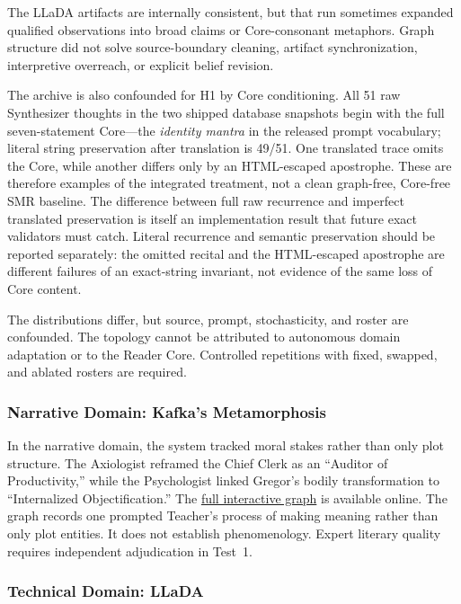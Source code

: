The LLaDA artifacts are internally consistent, but that run sometimes
expanded qualified observations into broad claims or Core-consonant metaphors.
Graph structure did not solve source-boundary cleaning, artifact synchronization, interpretive overreach, or explicit belief revision.

The archive is also confounded for H1 by Core conditioning. All 51 raw
Synthesizer thoughts in the two shipped database snapshots begin with the full
seven-statement Core---the \emph{identity mantra} in the released prompt
vocabulary; literal string preservation after translation is 49/51.
One translated trace omits the Core, while another differs only by an
HTML-escaped apostrophe. These are therefore examples of the integrated treatment,
not a clean graph-free, Core-free SMR baseline. The difference between full raw
recurrence and imperfect translated preservation is itself an implementation
result that future exact validators must catch. Literal recurrence and semantic
preservation should be reported separately: the omitted recital and the
HTML-escaped apostrophe are different failures of an exact-string invariant,
not evidence of the same loss of Core content.

The distributions differ, but source, prompt, stochasticity, and roster are
confounded. The topology cannot be attributed to autonomous domain adaptation
or to the Reader Core. Controlled repetitions with fixed, swapped, and ablated
rosters are required.


\subsubsection{Narrative Domain: Kafka's Metamorphosis}

In the narrative domain, the system tracked moral stakes rather than only plot
structure. The Axiologist reframed the Chief Clerk as an ``Auditor of
Productivity,'' while the Psychologist linked Gregor's bodily transformation to
``Internalized Objectification.'' The
\href{https://emergentwisdom.org/entangled-alignment/?project=metamorphosis}{full interactive graph}
is available online.
The graph records one prompted Teacher's process of making meaning rather than
only plot entities. It does not establish phenomenology. Expert literary quality requires
independent adjudication in Test~1.


\subsubsection{Technical Domain: LLaDA}\label{sec:llada-case}

